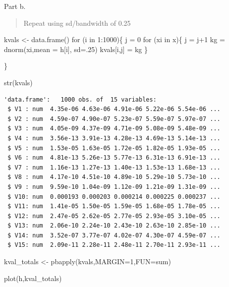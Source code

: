 \documentclass[
  letterpaper,
  DIV=11,
  numbers=noendperiod]{scrartcl}
\newenvironment{Shaded}{\begin{snugshade}}{\end{snugshade}}
\newcommand{\AttributeTok}[1]{\textcolor[rgb]{0.40,0.45,0.13}{#1}}
\newcommand{\ControlFlowTok}[1]{\textcolor[rgb]{0.00,0.23,0.31}{#1}}
\newcommand{\DecValTok}[1]{\textcolor[rgb]{0.68,0.00,0.00}{#1}}
\newcommand{\FunctionTok}[1]{\textcolor[rgb]{0.28,0.35,0.67}{#1}}
\newcommand{\NormalTok}[1]{\textcolor[rgb]{0.00,0.23,0.31}{#1}}
\newcommand{\OtherTok}[1]{\textcolor[rgb]{0.00,0.23,0.31}{#1}}
\newcommand{\SpecialCharTok}[1]{\textcolor[rgb]{0.37,0.37,0.37}{#1}}
\newcommand{\StringTok}[1]{\textcolor[rgb]{0.13,0.47,0.30}{#1}}
\begin{document}
Part b.

\begin{quote}
Repeat using sd/bandwidth of 0.25
\end{quote}

\begin{Shaded}
\begin{Highlighting}[]
\NormalTok{kvals }\OtherTok{\textless{}{-}} \FunctionTok{data.frame}\NormalTok{()}
\ControlFlowTok{for}\NormalTok{ (i }\ControlFlowTok{in} \DecValTok{1}\SpecialCharTok{:}\DecValTok{1000}\NormalTok{)\{}
\NormalTok{  j }\OtherTok{=} \DecValTok{0}
  \ControlFlowTok{for}\NormalTok{ (xi }\ControlFlowTok{in}\NormalTok{ x)\{}
\NormalTok{    j }\OtherTok{=}\NormalTok{ j}\SpecialCharTok{+}\DecValTok{1}
\NormalTok{    kg }\OtherTok{=} \FunctionTok{dnorm}\NormalTok{(xi,}\AttributeTok{mean =}\NormalTok{ h[i], }\AttributeTok{sd=}\NormalTok{.}\DecValTok{25}\NormalTok{)}
\NormalTok{    kvals[i,j] }\OtherTok{=}\NormalTok{ kg}
\NormalTok{  \}}

\NormalTok{\}}

\FunctionTok{str}\NormalTok{(kvals)}
\end{Highlighting}
\end{Shaded}

\begin{verbatim}
'data.frame':   1000 obs. of  15 variables:
 $ V1 : num  4.35e-06 4.63e-06 4.91e-06 5.22e-06 5.54e-06 ...
 $ V2 : num  4.59e-07 4.90e-07 5.23e-07 5.59e-07 5.97e-07 ...
 $ V3 : num  4.05e-09 4.37e-09 4.71e-09 5.08e-09 5.48e-09 ...
 $ V4 : num  3.56e-13 3.91e-13 4.28e-13 4.69e-13 5.14e-13 ...
 $ V5 : num  1.53e-05 1.63e-05 1.72e-05 1.82e-05 1.93e-05 ...
 $ V6 : num  4.81e-13 5.26e-13 5.77e-13 6.31e-13 6.91e-13 ...
 $ V7 : num  1.16e-13 1.27e-13 1.40e-13 1.53e-13 1.68e-13 ...
 $ V8 : num  4.17e-10 4.51e-10 4.89e-10 5.29e-10 5.73e-10 ...
 $ V9 : num  9.59e-10 1.04e-09 1.12e-09 1.21e-09 1.31e-09 ...
 $ V10: num  0.000193 0.000203 0.000214 0.000225 0.000237 ...
 $ V11: num  1.41e-05 1.50e-05 1.59e-05 1.68e-05 1.78e-05 ...
 $ V12: num  2.47e-05 2.62e-05 2.77e-05 2.93e-05 3.10e-05 ...
 $ V13: num  2.06e-10 2.24e-10 2.43e-10 2.63e-10 2.85e-10 ...
 $ V14: num  3.52e-07 3.77e-07 4.02e-07 4.30e-07 4.59e-07 ...
 $ V15: num  2.09e-11 2.28e-11 2.48e-11 2.70e-11 2.93e-11 ...
\end{verbatim}

\begin{Shaded}
\begin{Highlighting}[]
\NormalTok{kval\_totals }\OtherTok{\textless{}{-}} \FunctionTok{pbapply}\NormalTok{(kvals,}\AttributeTok{MARGIN=}\DecValTok{1}\NormalTok{,}\AttributeTok{FUN=}\StringTok{\textquotesingle{}sum\textquotesingle{}}\NormalTok{)}

\FunctionTok{plot}\NormalTok{(h,kval\_totals)}
\end{Highlighting}
\end{Shaded}
\end{document}
